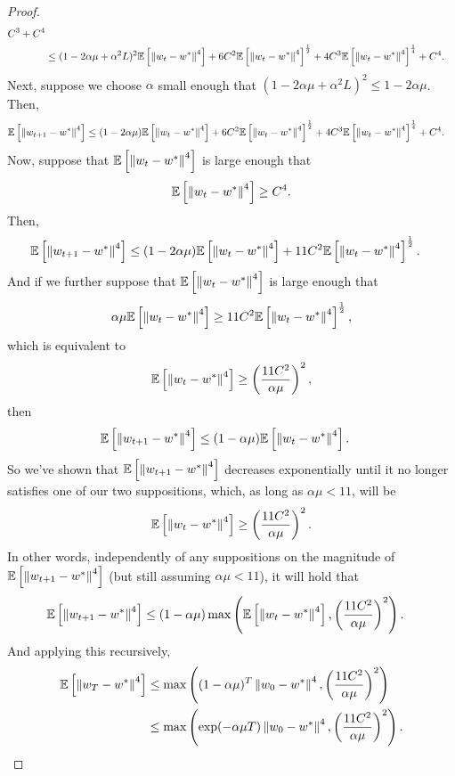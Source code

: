 \begin{proof}
\begin{align*}
  C^3
  +
  C^4 \\
  &\le
  (1 - 2 \alpha \mu + \alpha^2 L)^2 \mathbb{E}\left[ \left\| w_t - w^* \right\|^4 \right]
  +
  6 C^2 \mathbb{E}\left[ \left\| w_t - w^* \right\|^4 \right]^{\frac{1}{2}}
  +
  4 C^3 \mathbb{E}\left[ \left\| w_t - w^* \right\|^4 \right]^{\frac{1}{4}}
  +
  C^4.
\end{align*}
Next, suppose we choose $\alpha$ small enough that $(1 - 2 \alpha \mu + \alpha^2 L)^2 \le 1 - 2 \alpha \mu$. Then,
\begin{align*}
  \mathbb{E}\left[  \left\| w_{t+1} - w^* \right\|^4  \right]
  &\le
  (1 - 2 \alpha \mu) \mathbb{E}\left[ \left\| w_t - w^* \right\|^4 \right]
  +
  6 C^2 \mathbb{E}\left[ \left\| w_t - w^* \right\|^4 \right]^{\frac{1}{2}}
  +
  4 C^3 \mathbb{E}\left[ \left\| w_t - w^* \right\|^4 \right]^{\frac{1}{4}}
  +
  C^4.
\end{align*}
Now, suppose that $\mathbb{E}\left[ \left\| w_t - w^* \right\|^4 \right]$ is large enough that
\[
  \mathbb{E}\left[ \left\| w_t - w^* \right\|^4 \right] \ge C^4.
\]
Then,
\begin{align*}
  \mathbb{E}\left[  \left\| w_{t+1} - w^* \right\|^4  \right]
  &\le
  (1 - 2 \alpha \mu) \mathbb{E}\left[ \left\| w_t - w^* \right\|^4 \right]
  +
  11 C^2 \mathbb{E}\left[ \left\| w_t - w^* \right\|^4 \right]^{\frac{1}{2}}.
\end{align*}
And if we further suppose that $\mathbb{E}\left[ \left\| w_t - w^* \right\|^4 \right]$ is large enough that
\[
  \alpha \mu \mathbb{E}\left[ \left\| w_t - w^* \right\|^4 \right] \ge 11 C^2 \mathbb{E}\left[ \left\| w_t - w^* \right\|^4 \right]^{\frac{1}{2}},
\]
which is equivalent to
\[
  \mathbb{E}\left[ \left\| w_t - w^* \right\|^4 \right] \ge \left( \frac{11 C^2}{\alpha \mu} \right)^2,
\]
then
\begin{align*}
  \mathbb{E}\left[  \left\| w_{t+1} - w^* \right\|^4  \right]
  &\le
  (1 - \alpha \mu) \mathbb{E}\left[ \left\| w_t - w^* \right\|^4 \right].
\end{align*}
So we've shown that $\mathbb{E}\left[  \left\| w_{t+1} - w^* \right\|^4  \right]$ decreases exponentially until it no longer satisfies one of our two suppositions, which,  
as long as $\alpha \mu < 11$, will be
\[
  \mathbb{E}\left[ \left\| w_t - w^* \right\|^4 \right] \ge \left( \frac{11 C^2}{\alpha \mu} \right)^2.
\]
In other words, independently of any suppositions on the magnitude of $\mathbb{E}\left[  \left\| w_{t+1} - w^* \right\|^4  \right]$ (but still assuming $\alpha \mu < 11$), it will hold that
\begin{align*}
  \mathbb{E}\left[  \left\| w_{t+1} - w^* \right\|^4  \right]
  &\le
  (1 - \alpha \mu) \max\left( \mathbb{E}\left[ \left\| w_t - w^* \right\|^4 \right], \left( \frac{11 C^2}{\alpha \mu} \right)^2 \right).
\end{align*}
And applying this recursively,
\begin{align*}
  \Exv{ \norm{w_T - w^*}^4 }
  &\le
  \max\left( (1 - \alpha \mu)^T \norm{w_0 - w^*}^4, \left( \frac{11 C^2}{\alpha \mu} \right)^2 \right) \\
  &\le
  \max\left( \exp(- \alpha \mu T) \norm{w_0 - w^*}^4, \left( \frac{11 C^2}{\alpha \mu} \right)^2 \right).

\end{align*}
\end{proof}
